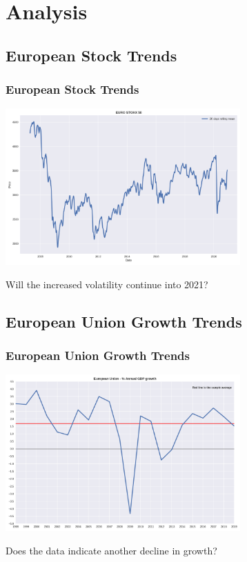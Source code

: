 \documentclass[10pt]{beamer}
\begin{document}
\section{Analysis}
\begin{frame}
\subsection{European Stock Trends}
\frametitle{European Stock Trends}

\begin{center}
\includegraphics[height=6cm]{STOXX50E.png}
\end{center}

Will the increased volatility continue into 2021?


\end{frame}
\begin{frame}
\subsection{European Union Growth Trends}
\frametitle{European Union Growth Trends}

\begin{center}
\includegraphics[height=6cm]{EU_GDP.png}
\end{center}

Does the data indicate another decline in growth?

\end{frame}
\end{document}
